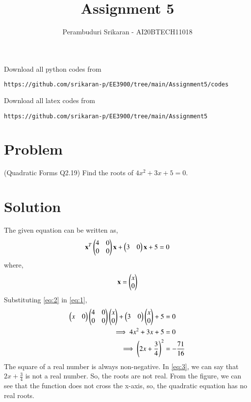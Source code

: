 \documentclass[journal,12pt,twocolumn]{IEEEtran}
\begin{document}
\let\vec\mathbf
\renewcommand{\thefigure}{\theproblem}
\def\putbox#1#2#3{\makebox[0in][l]{\makebox[#1][l]{}\raisebox{\baselineskip}[0in][0in]{\raisebox{#2}[0in][0in]{#3}}}}
     \def\rightbox#1{\makebox[0in][r]{#1}}
     \def\centbox#1{\makebox[0in]{#1}}
     \def\topbox#1{\raisebox{-\baselineskip}[0in][0in]{#1}}
     \def\midbox#1{\raisebox{-0.5\baselineskip}[0in][0in]{#1}}
\vspace{3cm}
\title{Assignment 5}
\author{Perambuduri Srikaran - AI20BTECH11018}
\maketitle
\newpage
\bigskip
\renewcommand{\thefigure}{\theenumi}
\renewcommand{\thetable}{\theenumi}
Download all python codes from
\begin{lstlisting}
https://github.com/srikaran-p/EE3900/tree/main/Assignment5/codes
\end{lstlisting}
Download all latex codes from
\begin{lstlisting}
https://github.com/srikaran-p/EE3900/tree/main/Assignment5
\end{lstlisting}
\section*{Problem}
(Quadratic Forms Q2.19) Find the roots of $4x^2 + 3x + 5 = 0$.
\section*{Solution}
The given equation can be written as,
\begin{align}
    \vec{x}^T\myvec{4 & 0 \\ 0 & 0}\vec{x} + \myvec{3 & 0}\vec{x} + 5 = 0 \label{eq:1}
\end{align}
where,
\begin{align}
    \vec{x} = \myvec{x \\ 0} \label{eq:2}
\end{align}
Substituting \eqref{eq:2} in \eqref{eq:1},
\begin{align}
    \begin{pmatrix}x & 0\end{pmatrix}\begin{pmatrix}4 & 0 \\ 0 & 0\end{pmatrix}\begin{pmatrix}x \\ 0\end{pmatrix} + \begin{pmatrix}3 & 0\end{pmatrix}\begin{pmatrix}x \\ 0\end{pmatrix} + 5 &= 0 \\
    \implies 4x^2 + 3x + 5 &= 0\\
    \implies \left(2x + \frac{3}{4}\right)^2 &= -\frac{71}{16}\label{eq:3}
\end{align}
The square of a real number is always non-negative. In \eqref{eq:3}, we can say that $2x + \frac{3}{4}$ is not a real number. So, the roots are not real. From the figure, we can see that the function does not cross the x-axis, so, the quadratic equation has no real roots.
\end{document}
